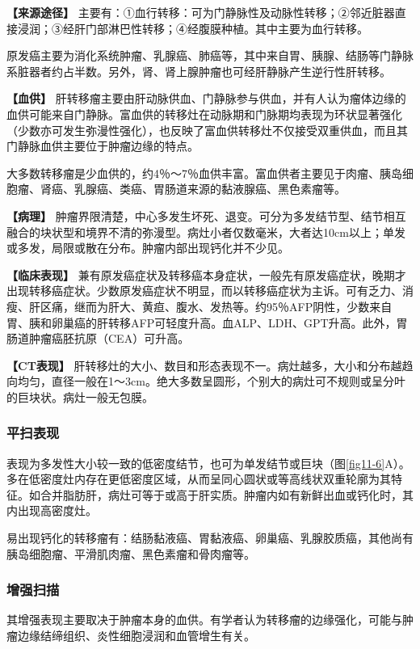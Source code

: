 \textbf{【来源途径】}
主要有：①血行转移：可为门静脉性及动脉性转移；②邻近脏器直接浸润；③经肝门部淋巴性转移；④经腹膜种植。其中主要为血行转移。

原发癌主要为消化系统肿瘤、乳腺癌、肺癌等，其中来自胃、胰腺、结肠等门静脉系脏器者约占半数。另外，肾、肾上腺肿瘤也可经肝静脉产生逆行性肝转移。

\textbf{【血供】}
肝转移瘤主要由肝动脉供血、门静脉参与供血，并有人认为瘤体边缘的血供可能来自门静脉。富血供的转移灶在动脉期和门脉期均表现为环状显著强化（少数亦可发生弥漫性强化），也反映了富血供转移灶不仅接受双重供血，而且其门静脉血供主要位于肿瘤边缘的特点。

大多数转移瘤是少血供的，约4％～7％血供丰富。富血供者主要见于肉瘤、胰岛细胞瘤、肾癌、乳腺癌、类癌、胃肠道来源的黏液腺癌、黑色素瘤等。

\textbf{【病理】}
肿瘤界限清楚，中心多发生坏死、退变。可分为多发结节型、结节相互融合的块状型和境界不清的弥漫型。病灶小者仅数毫米，大者达10cm以上；单发或多发，局限或散在分布。肿瘤内部出现钙化并不少见。

\textbf{【临床表现】}
兼有原发癌症状及转移癌本身症状，一般先有原发癌症状，晚期才出现转移癌症状。少数原发癌症状不明显，而以转移癌症状为主诉。可有乏力、消瘦、肝区痛，继而为肝大、黄疸、腹水、发热等。约95％AFP阴性，少数来自胃、胰和卵巢癌的肝转移AFP可轻度升高。血ALP、LDH、GPT升高。此外，胃肠道肿瘤癌胚抗原（CEA）可升高。

\textbf{【CT表现】}
肝转移灶的大小、数目和形态表现不一。病灶越多，大小和分布越趋向均匀，直径一般在1～3cm。绝大多数呈圆形，个别大的病灶可不规则或呈分叶的巨块状。病灶一般无包膜。

\subsubsection{平扫表现}

表现为多发性大小较一致的低密度结节，也可为单发结节或巨块（图\ref{fig11-6}A）。多在低密度灶内存在更低密度区域，从而呈同心圆状或等高线状双重轮廓为其特征。如合并脂肪肝，病灶可等于或高于肝实质。肿瘤内如有新鲜出血或钙化时，其内出现高密度灶。

易出现钙化的转移瘤有：结肠黏液癌、胃黏液癌、卵巢癌、乳腺胶质癌，其他尚有胰岛细胞瘤、平滑肌肉瘤、黑色素瘤和骨肉瘤等。

\subsubsection{增强扫描}

其增强表现主要取决于肿瘤本身的血供。有学者认为转移瘤的边缘强化，可能与肿瘤边缘结缔组织、炎性细胞浸润和血管增生有关。

